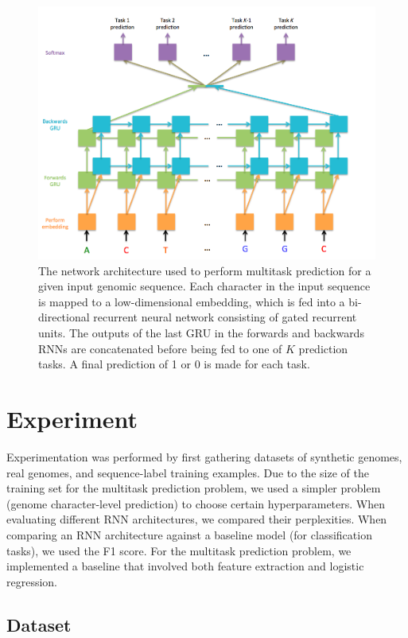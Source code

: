 \documentclass{article} %
\begin{document}
\begin{figure}[!htb]
	\centering
	\includegraphics[scale=0.4]{Figure1}
	\caption{The network architecture used to perform multitask prediction for a given input genomic sequence. Each character in the input sequence is mapped to a low-dimensional embedding, which is fed into a bi-directional recurrent neural network consisting of gated recurrent units. The outputs of the last GRU in the forwards and backwards RNNs are concatenated before being fed to one of $K$ prediction tasks. A final prediction of 1 or 0 is made for each task.}
\end{figure}

\section{Experiment}

Experimentation was performed by first gathering datasets of synthetic genomes, real genomes, and sequence-label training examples. Due to the size of the training set for the multitask prediction problem, we used a simpler problem (genome character-level prediction) to choose certain hyperparameters. When evaluating different RNN architectures, we compared their perplexities. When comparing an RNN architecture against a baseline model (for classification tasks), we used the F1 score. For the multitask prediction problem, we implemented a baseline that involved both feature extraction and logistic regression.

\subsection{Dataset}
\end{document}
